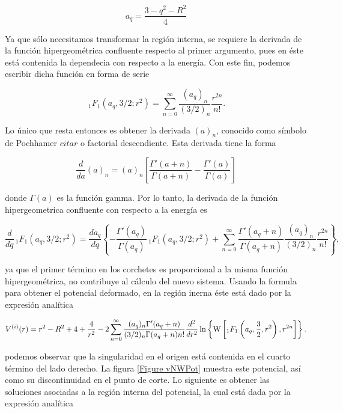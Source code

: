 \begin{equation}
a_q = \frac{3-q^2-R^2}{4}
\end{equation}

Ya que sólo necesitamos transformar la región interna, se requiere la derivada de la función hipergeométrica confluente respecto al primer argumento, pues en éste está contenida la dependecia con respecto a la energía. Con este fin, podemos escribir dicha función en forma de serie

\begin{equation*}
\, _1F_1\left(a_q,3/2;r^2 \right) = \sum_{n=0}^{\infty} \frac{(a_q)_n}{(3/2)_n} \frac{r^{2n}}{n!}.
\end{equation*}

Lo único que resta entonces es obtener la derivada $(a)_n$, conocido como símbolo de Pochhamer $citar$ o factorial descendiente. Esta derivada tiene la forma

\begin{equation*}
\frac{d}{da}(a)_n = (a)_n \left[ \frac{\Gamma'(a + n)}{\Gamma(a + n)}-\frac{\Gamma'(a)}{\Gamma(a)} \right]
\end{equation*}

donde $\Gamma(a)$ es la función gamma. Por lo tanto, la derivada de la función hipergeometrica confluente con respecto a la energía es

\begin{equation*}
\frac{d}{dq}\, _1F_1\left(a_q,3/2;r^2 \right) = \frac{da_q}{dq}\left \{ -\frac{\Gamma'(a_q)}{\Gamma(a_q)}\, _1F_1\left(a_q,3/2;r^2 \right)  + \sum_{n=0}^{\infty} \frac{\Gamma'(a_q + n)}{\Gamma(a_q + n)} \frac{(a_q)_n}{(3/2)_n} \frac{r^{2n}}{n!} \right \},
\label{DEFH}
\end{equation*}

ya que el primer término en los corchetes es proporcional a la misma función hipergeométrica, no contribuye al cálculo del nuevo sistema. Usando la formula para obtener el potencial deformado, en la región inerna éste está dado por la expresión analítica

\begin{equation*}
V^{(i)}(r)=r^{2}-R^{2} + 4+\frac{4}{r^2}-2\sum_{n=0}^{\infty}\frac{(a_{q})_{n}\Gamma'(a_{q}+n)}{(3/2)_{n}\Gamma(a_{q}+n)n!}\frac{d^{2}}{dr^{2}}\ln\left\{ {\rm W} \left[  _1F_1\left(a_{q},\frac{3}{2},r^{2}\right),r^{2n}\right]\right\}.\label{DDT-V<}
\end{equation*}

podemos observar que la singularidad en el origen está contenida en el cuarto término del lado derecho. La figura \ref{Figure vNWPot} muestra este potencial, así como su discontinuidad en el punto de corte. Lo siguiente es obtener las soluciones asociadas a la región interna del potencial, la cual está dada por la expresión analítica

